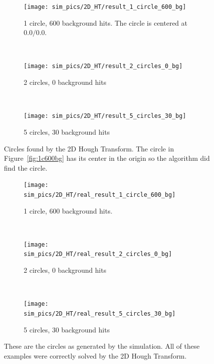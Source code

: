 \documentclass[11pt,twoside]{scrreprt}
\begin{document}
\begin{figure}[htp]
        \centering
        \begin{subfigure}[t]{0.3\textwidth}
                \centering
                \texttt{[image: sim\_pics/2D\_HT/result\_1\_circle\_600\_bg]}
                \caption{1 circle, 600 background hits. The circle is centered at $0.0/0.0$.}
                \label{fig:2d_1c600bg}
        \end{subfigure}%
        ~ %
        \begin{subfigure}[t]{0.3\textwidth}
                \centering
                \texttt{[image: sim\_pics/2D\_HT/result\_2\_circles\_0\_bg]}
                \caption{2 circles, 0 background hits}
                \label{fig:2d_2c0bg}
        \end{subfigure}%
        ~ %
        \begin{subfigure}[t]{0.3\textwidth}
                \centering
                \texttt{[image: sim\_pics/2D\_HT/result\_5\_circles\_30\_bg]}
                \caption{5 circles, 30 background hits}
                \label{fig:2d_5c30bg}
        \end{subfigure}
        \caption{Circles found by the 2D Hough Transform. The circle in Figure~\ref{fig:1c600bg} has its center in the origin so the algorithm did find the circle.}\label{fig:2D_HT_results}

                \begin{subfigure}[t]{0.3\textwidth}
                \centering
                \texttt{[image: sim\_pics/2D\_HT/real\_result\_1\_circle\_600\_bg]}
                \caption{1 circle, 600 background hits.}
                \label{fig:2d_real_1c600bg}
        \end{subfigure}%
        ~ %
        \begin{subfigure}[t]{0.3\textwidth}
                \centering
                \texttt{[image: sim\_pics/2D\_HT/real\_result\_2\_circles\_0\_bg]}
                \caption{2 circles, 0 background hits}
                \label{fig:2d_real_2c0bg}
        \end{subfigure}%
        ~ %
        \begin{subfigure}[t]{0.3\textwidth}
                \centering
                \texttt{[image: sim\_pics/2D\_HT/real\_result\_5\_circles\_30\_bg]}
                \caption{5 circles, 30 background hits}
                \label{fig:2d_real_5c30bg}
        \end{subfigure}
        \caption{These are the circles as generated by the simulation. All of these examples were correctly solved by the 2D Hough Transform.}\label{fig:real_2d_ht_results}


\end{figure}
\end{document}
